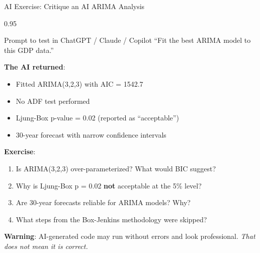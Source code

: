 \documentclass[9pt, aspectratio=169, t]{beamer}
\begin{document}
\begin{frame}{AI Exercise: Critique an AI ARIMA Analysis}
    \begin{cminipage}{0.95\textwidth}
    \vspace{-0.3cm}
    \begin{block}{\footnotesize Prompt to test in ChatGPT / Claude / Copilot}
        {\footnotesize
        ``Fit the best ARIMA model to this GDP data.''
        }
    \end{block}
    \vspace{-2mm}
    {\footnotesize
    \textbf{The AI returned}:
    \begin{itemize}\setlength{\itemsep}{0pt}
        \item Fitted ARIMA(3,2,3) with AIC = 1542.7
        \item No ADF test performed
        \item Ljung-Box p-value = 0.02 (reported as ``acceptable'')
        \item 30-year forecast with narrow confidence intervals
    \end{itemize}
    }
    \vspace{-2mm}
    {\footnotesize
    \textbf{Exercise}:
    \begin{enumerate}\setlength{\itemsep}{0pt}
        \item Is ARIMA(3,2,3) over-parameterized? What would BIC suggest?
        \item Why is Ljung-Box p = 0.02 \textbf{not} acceptable at the 5\% level?
        \item Are 30-year forecasts reliable for ARIMA models? Why?
        \item What steps from the Box-Jenkins methodology were skipped?
    \end{enumerate}
    }
    \vspace{-2mm}
    \begin{alertblock}{}
        {\footnotesize \textbf{Warning}: AI-generated code may run without errors and look professional. \textit{That does not mean it is correct.}}
    \end{alertblock}
    \end{cminipage}
\end{frame}
\end{document}
